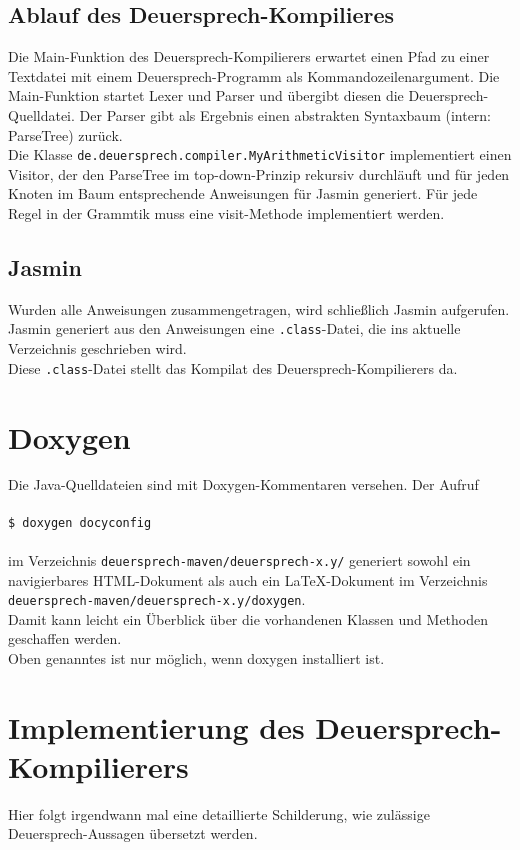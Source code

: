 \documentclass[a4paper]{article}
\begin{document}
    \subsection{Ablauf des Deuersprech-Kompilieres}
    \noindent
    Die Main-Funktion des Deuersprech-Kompilierers erwartet einen Pfad zu einer Textdatei mit einem Deuersprech-Programm als Kommandozeilenargument.
    Die Main-Funktion startet Lexer und Parser und übergibt diesen die Deuersprech-Quelldatei. Der Parser gibt als Ergebnis einen abstrakten Syntaxbaum (intern: ParseTree) zurück. \\
    
    \noindent
    Die Klasse \texttt{de.deuersprech.compiler.MyArithmeticVisitor} implementiert einen Visitor, der den ParseTree im top-down-Prinzip rekursiv durchläuft und für jeden Knoten im Baum entsprechende Anweisungen für Jasmin generiert. Für jede Regel in der Grammtik muss eine visit-Methode implementiert werden.\\

    \subsection{Jasmin}
    \noindent
    Wurden alle Anweisungen zusammengetragen, wird schließlich Jasmin aufgerufen. 
    Jasmin generiert aus den Anweisungen eine \texttt{.class}-Datei, die ins aktuelle Verzeichnis geschrieben wird. \\
    Diese \texttt{.class}-Datei stellt das Kompilat des Deuersprech-Kompilierers da.

    
    \section{Doxygen}
    Die Java-Quelldateien sind mit Doxygen-Kommentaren versehen. Der Aufruf \\
    \\
    \texttt{\$ doxygen docyconfig} \\
    \\
    im Verzeichnis \texttt{deuersprech-maven/deuersprech-x.y/} generiert sowohl ein navigierbares HTML-Dokument als auch ein LaTeX-Dokument im Verzeichnis \texttt{deuersprech-maven/deuersprech-x.y/doxygen}. \\
    Damit kann leicht ein Überblick über die vorhandenen Klassen und Methoden geschaffen werden. \\

    \noindent
    Oben genanntes ist nur möglich, wenn doxygen installiert ist. \\



    \pagebreak
    \section{Implementierung des Deuersprech-Kompilierers}
    Hier folgt irgendwann mal eine detaillierte Schilderung, wie zulässige Deuersprech-Aussagen übersetzt werden. \\
\end{document}

